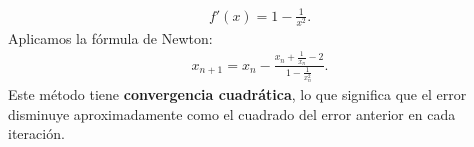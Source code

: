 \begin{homeworkProblem}
\begin{enumerate}
\begin{solucion}
        \begin{align*}
          f'(x) = 1 - \frac{1}{x^2}.
        \end{align*}
        Aplicamos la fórmula de Newton:
        \begin{align*}
          x_{n+1} = x_n - \frac{x_n + \frac{1}{x_n} - 2}{1 - \frac{1}{x_n^2}}.
        \end{align*}
        Este método tiene \textbf{convergencia cuadrática}, lo que significa que el error disminuye aproximadamente como el cuadrado del error anterior en cada iteración. 
      \end{solucion}
  \end{enumerate}
\end{homeworkProblem}
